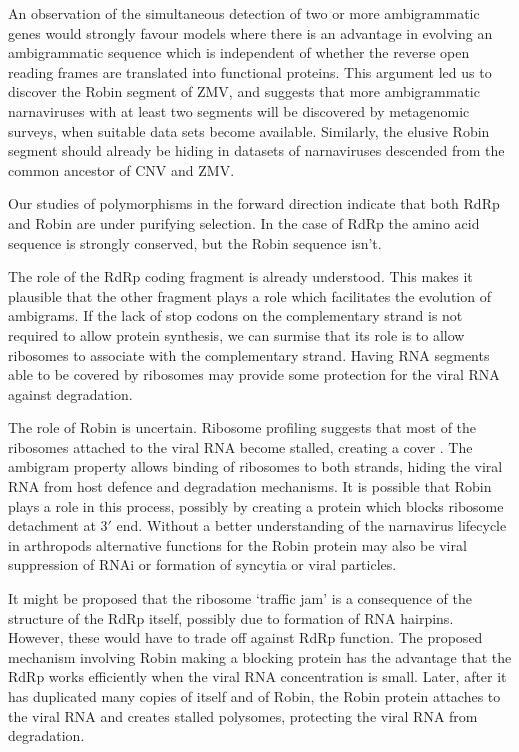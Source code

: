 \documentclass[unnumsec,webpdf,contemporary,large,namedate]{oup-authoring-template}%
\theoremstyle{thmstyleone}%
\theoremstyle{thmstyletwo}%
\theoremstyle{thmstylethree}%
\begin{document}
An observation of the simultaneous detection of two or more ambigrammatic genes would
strongly favour models where there is an advantage in evolving an
ambigrammatic sequence which is independent of whether the reverse open reading
frames are translated into functional proteins. This argument led us to discover the Robin segment
of ZMV, and suggests that more ambigrammatic narnaviruses with at least two segments will be discovered
by metagenomic surveys, when suitable data sets become available.
Similarly, the elusive Robin segment should already be hiding in datasets of narnaviruses descended from the common ancestor of CNV and ZMV.


Our studies of polymorphisms in the forward direction indicate that both RdRp and Robin are under purifying selection.
In the case of RdRp the amino acid sequence is strongly conserved,
but the Robin sequence isn't.

The role of the RdRp coding fragment
is already understood. This makes it plausible that the other fragment plays a role which facilitates the
evolution of ambigrams. If the lack of stop codons on the complementary strand is not required
to allow protein synthesis, we can surmise that its role is to allow ribosomes to associate with the
complementary strand. Having RNA segments able to be covered by ribosomes may provide some protection
for the viral RNA against degradation.

The role of Robin is uncertain. Ribosome profiling suggests that most of the ribosomes attached to
the viral RNA become stalled, creating a cover \cite{Cep20,Ret+20,Wil+21}. The ambigram property
allows binding of ribosomes to both strands, hiding the viral RNA from host defence and degradation mechanisms.
It is possible that Robin plays a role in this process, possibly by creating a protein which
blocks ribosome detachment at $3'$ end. Without a better understanding of the narnavirus lifecycle in arthropods
alternative functions for the Robin protein may also be viral suppression of RNAi\cite{mie_14} or formation of syncytia or viral particles.

It might be proposed that the ribosome \lq traffic jam' is a consequence of the structure of the
RdRp itself, possibly due to formation of RNA hairpins. However, these would have to trade off against RdRp function.
The proposed mechanism involving Robin making a blocking protein
has the advantage that the RdRp works efficiently when the viral RNA concentration is small.
Later, after it has duplicated many copies of itself and of Robin, the Robin protein attaches
to the viral RNA and creates stalled polysomes, protecting the viral RNA from degradation.
\end{document}
